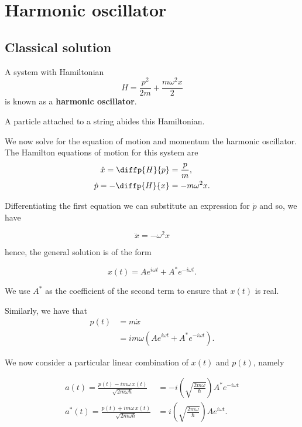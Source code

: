 \documentclass[12pt, a4paper]{article}
\begin{document}
\section{Harmonic oscillator}

\subsection{Classical solution}

\begin{definition}
    A system with Hamiltonian 
    \[H = \frac{p^2}{2m}+\frac{m\omega^2 x}{2}\]
    is known as a \textbf{harmonic oscillator}.
\end{definition}

\begin{example}
    A particle attached to a string abides this Hamiltonian.
\end{example}

We now solve for the equation of motion and momentum the harmonic oscillator. The Hamilton equations of motion for this system are 
\[\begin{aligned}
    \dot{x} = \diffp{H}{p} &= \frac{p}{m}, \\
    \dot{p} = -\diffp{H}{x} &= -m\omega^2x.
\end{aligned}\]

Differentiating the first equation we can substitute an expression for \(\dot{p}\) and so, we have 

\[\ddot{x} = - \omega^2 x\]

hence, the general solution is of the form 

\[x(t) = Ae^{i\omega t}+A^*e^{-i\omega t}.\]

\begin{mdnote}
    We use \(A^*\) as the coefficient of the second term to ensure that \(x(t)\) is real.
\end{mdnote}

Similarly, we have that 
\[\begin{aligned}
    p(t) &= m \dot{x} \\
    &= im\omega\left( Ae^{i\omega t}+A^*e^{-i\omega t} \right).
\end{aligned}\]

We now consider a particular linear combination of \(x(t)\) and \(p(t)\), namely 

\[\begin{aligned}
    a(t) = \frac{p(t)-im\omega \, x(t)}{\sqrt{2m\omega \hbar}} &= - i \left( \sqrt{\frac{2m\omega}{\hbar}} \right) A^* e^{-i\omega t} \\
    a^*(t) = \frac{p(t)+im\omega \, x(t)}{\sqrt{2m\omega \hbar}} &=  i \left( \sqrt{\frac{2m\omega}{\hbar}} \right) A e^{i\omega t}.
\end{aligned}\]
\end{document}
